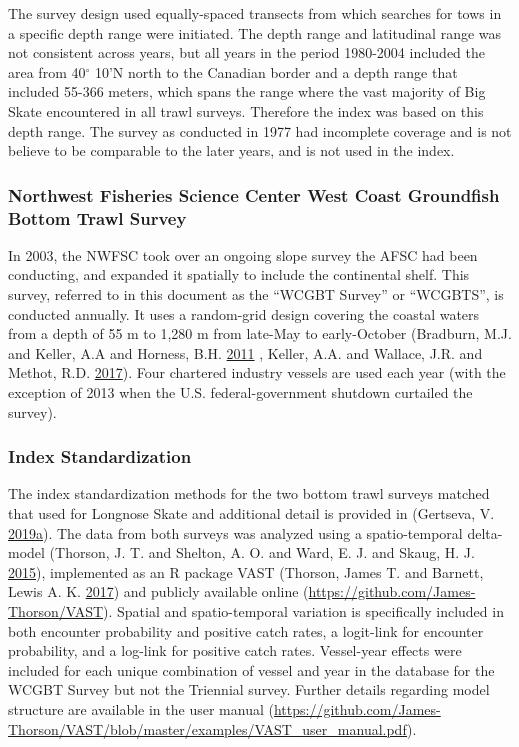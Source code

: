 \documentclass[12pt,]{article}
\begin{document}
The survey design used equally-spaced transects from which searches for
tows in a specific depth range were initiated. The depth range and
latitudinal range was not consistent across years, but all years in the
period 1980-2004 included the area from 40\(^\circ\) 10'N north to the
Canadian border and a depth range that included 55-366 meters, which
spans the range where the vast majority of Big Skate encountered in all
trawl surveys. Therefore the index was based on this depth range. The
survey as conducted in 1977 had incomplete coverage and is not believe
to be comparable to the later years, and is not used in the index.

\hypertarget{northwest-fisheries-science-center-west-coast-groundfish-bottom-trawl-survey}{%
\subsubsection{Northwest Fisheries Science Center West Coast Groundfish
Bottom Trawl
Survey}\label{northwest-fisheries-science-center-west-coast-groundfish-bottom-trawl-survey}}

In 2003, the NWFSC took over an ongoing slope survey the AFSC had been
conducting, and expanded it spatially to include the continental shelf.
This survey, referred to in this document as the ``WCGBT Survey'' or
``WCGBTS'', is conducted annually. It uses a random-grid design covering
the coastal waters from a depth of 55 m to 1,280 m from late-May to
early-October (Bradburn, M.J. and Keller, A.A and Horness, B.H.
\protect\hyperlink{ref-Bradburn2011}{2011} , Keller, A.A. and Wallace,
J.R. and Methot, R.D. \protect\hyperlink{ref-Keller2017}{2017}). Four
chartered industry vessels are used each year (with the exception of
2013 when the U.S. federal-government shutdown curtailed the survey).

\hypertarget{index-standardization}{%
\subsubsection{Index Standardization}\label{index-standardization}}

The index standardization methods for the two bottom trawl surveys
matched that used for Longnose Skate and additional detail is provided
in (Gertseva, V.
\protect\hyperlink{ref-Gertseva2019}{2019}\protect\hyperlink{ref-Gertseva2019}{a}).
The data from both surveys was analyzed using a spatio-temporal
delta-model (Thorson, J. T. and Shelton, A. O. and Ward, E. J. and
Skaug, H. J. \protect\hyperlink{ref-Thorson2015}{2015}), implemented as
an R package VAST (Thorson, James T. and Barnett, Lewis A. K.
\protect\hyperlink{ref-Thorson2017a}{2017}) and publicly available
online (\url{https://github.com/James-Thorson/VAST}). Spatial and
spatio-temporal variation is specifically included in both encounter
probability and positive catch rates, a logit-link for encounter
probability, and a log-link for positive catch rates. Vessel-year
effects were included for each unique combination of vessel and year in
the database for the WCGBT Survey but not the Triennial survey. Further
details regarding model structure are available in the user manual
(\url{https://github.com/James-Thorson/VAST/blob/master/examples/VAST_user_manual.pdf}).
\end{document}
